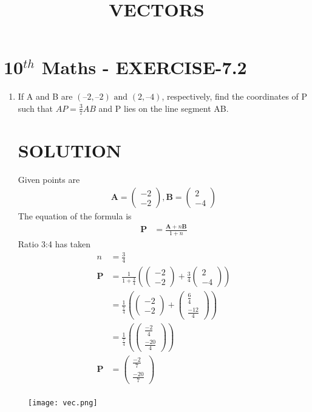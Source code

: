 \documentclass[journal,10pt,twocolumn]{article}
\providecommand{\brak}[1]{\ensuremath{\left(#1\right)}}
\newcommand{\myvec}[1]{\ensuremath{\begin{pmatrix}#1\end{pmatrix}}}
\let\vec\mathbf
\begin{document}
\begin{center}
\title{\textbf{VECTORS}}
\date{\vspace{-5ex}} %
\maketitle
\end{center}

\section{10$^{th}$ Maths - EXERCISE-7.2}

\begin{enumerate}
\item If A and B are $(– 2, – 2)\text{ and }(2, – 4)$, respectively, find the coordinates of P such that $AP =\frac{3}{7}AB$ and P lies on the line segment AB. 

\section{SOLUTION}
Given points are
\begin{align}
\vec{A}=\myvec{-2\\ -2} ,
\vec{B}=\myvec{2\\ -4}
\end{align}
The equation of the formula is
\begin{align}
\vec{P}&=\frac{\vec{A}+n\vec{B}}{1+n}
\end{align}
Ratio 3:4 has taken 
\begin{align}
n&=\frac{3}{4}\\
\vec{P}&=\frac{1}{1+\frac{3}{4}}\brak{\myvec{-2\\-2}+\frac{3}{4}\myvec{2\\-4}}\\
&=\frac{1}{\frac{7}{4}}\brak{\myvec{-2\\ -2}+\myvec{\frac{6}{4}\\[2pt] \frac{-12}{4}}}\\
&=\frac{1}{\frac{7}{4}}\brak {\myvec{\frac{-2}{4}\\ \frac{-20}{4}}}\\
\vec{P}&=\myvec{\frac{-2}{7}\\ \frac{-20}{7}}\\
\end{align}
\end{enumerate}
\begin{figure}
   \centering 
 \texttt{[image: vec.png]}
   \caption{}
   \label{fig:vec.png}
   \end{figure}
\end{document}
